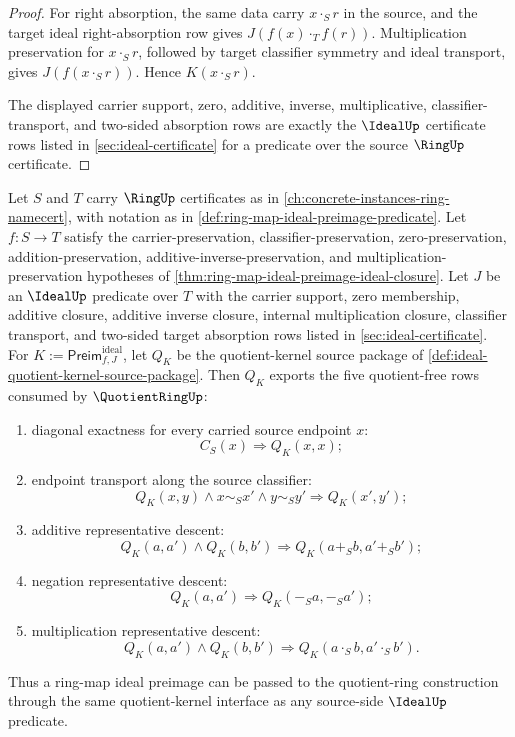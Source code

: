 \begin{proof}
For right absorption, the same data carry $x\cdot_S r$ in the source, and the target ideal right-absorption row gives $J(f(x)\cdot_T f(r))$. Multiplication preservation for $x\cdot_S r$, followed by target classifier symmetry and ideal transport, gives $J(f(x\cdot_S r))$. Hence $K(x\cdot_S r)$.

The displayed carrier support, zero, additive, inverse, multiplicative, classifier-transport, and two-sided absorption rows are exactly the $\IdealUp$ certificate rows listed in \autoref{sec:ideal-certificate} for a predicate over the source $\RingUp$ certificate.
\end{proof}

\begin{theorem}
\label{thm:ideal-preimage-quotientkernel-export-surface}
Let $S$ and $T$ carry $\RingUp$ certificates as in \autoref{ch:concrete-instances-ring-namecert}, with notation as in \autoref{def:ring-map-ideal-preimage-predicate}. Let $f:S\to T$ satisfy the carrier-preservation, classifier-preservation, zero-preservation, addition-preservation, additive-inverse-preservation, and multiplication-preservation hypotheses of \autoref{thm:ring-map-ideal-preimage-ideal-closure}. Let $J$ be an $\IdealUp$ predicate over $T$ with the carrier support, zero membership, additive closure, additive inverse closure, internal multiplication closure, classifier transport, and two-sided target absorption rows listed in \autoref{sec:ideal-certificate}. For $K:=\mathsf{Preim}^{\mathrm{ideal}}_{f,J}$, let $Q_K$ be the quotient-kernel source package of \autoref{def:ideal-quotient-kernel-source-package}. Then $Q_K$ exports the five quotient-free rows consumed by $\QuotientRingUp$:
\begin{enumerate}
\item diagonal exactness for every carried source endpoint $x$:
$$
C_S(x)\Longrightarrow Q_K(x,x);
$$
\item endpoint transport along the source classifier:
$$
Q_K(x,y)\land x\sim_S x'\land y\sim_S y'\Longrightarrow Q_K(x',y');
$$
\item additive representative descent:
$$
Q_K(a,a')\land Q_K(b,b')\Longrightarrow Q_K(a+_S b,a'+_S b');
$$
\item negation representative descent:
$$
Q_K(a,a')\Longrightarrow Q_K(-_S a,-_S a');
$$
\item multiplication representative descent:
$$
Q_K(a,a')\land Q_K(b,b')\Longrightarrow Q_K(a\cdot_S b,a'\cdot_S b').
$$
\end{enumerate}
Thus a ring-map ideal preimage can be passed to the quotient-ring construction through the same quotient-kernel interface as any source-side $\IdealUp$ predicate.
\end{theorem}
